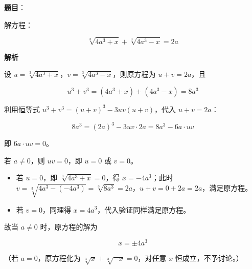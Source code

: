 \begin{answer}

\textbf{题目}：

解方程：

\nopagebreak[4]
\[
\sqrt[3]{4a^3+x}+\sqrt[3]{4a^3-x}=2a
\]

\textbf{解析}

设 $u=\sqrt[3]{4a^3+x}$，$v=\sqrt[3]{4a^3-x}$，则原方程为 $u+v=2a$，且

\nopagebreak[4]
\[
u^3+v^3=(4a^3+x)+(4a^3-x)=8a^3
\]

利用恒等式 $u^3+v^3=(u+v)^3-3uv(u+v)$，代入 $u+v=2a$：

\nopagebreak[4]
\[
8a^3=(2a)^3-3uv\cdot2a=8a^3-6a\cdot uv
\]

即 $6a\cdot uv=0$。

若 $a\ne0$，则 $uv=0$，即 $u=0$ 或 $v=0$。

\begin{itemize}
\item 若 $u=0$，即 $\sqrt[3]{4a^3+x}=0$，得 $x=-4a^3$；此时 $v=\sqrt[3]{4a^3-(-4a^3)}=\sqrt[3]{8a^3}=2a$，$u+v=0+2a=2a$，满足原方程。
\item 若 $v=0$，同理得 $x=4a^3$，代入验证同样满足原方程。
\end{itemize}

故当 $a\ne0$ 时，原方程的解为

\nopagebreak[4]
\[
x=\pm4a^3
\]

（若 $a=0$，原方程化为 $\sqrt[3]{x}+\sqrt[3]{-x}=0$，对任意 $x$ 恒成立，不予讨论。）


\end{answer}